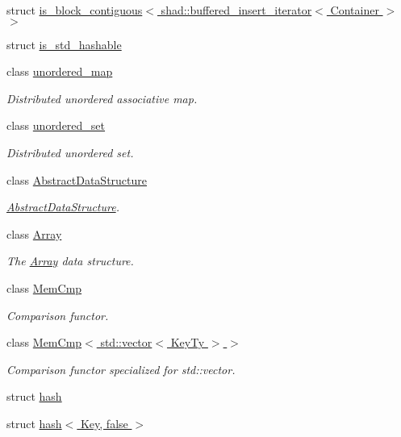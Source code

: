 \begin{DoxyCompactItemize}
\item 
struct \hyperlink{structshad_1_1is__block__contiguous_3_01shad_1_1buffered__insert__iterator_3_01Container_01_4_01_4}{is\-\_\-block\-\_\-contiguous$<$ shad\-::buffered\-\_\-insert\-\_\-iterator$<$ Container $>$ $>$}
\item 
struct \hyperlink{structshad_1_1is__std__hashable}{is\-\_\-std\-\_\-hashable}
\item 
class \hyperlink{classshad_1_1unordered__map}{unordered\-\_\-map}
\begin{DoxyCompactList}\small\item\em Distributed unordered associative map. \end{DoxyCompactList}\item 
class \hyperlink{classshad_1_1unordered__set}{unordered\-\_\-set}
\begin{DoxyCompactList}\small\item\em Distributed unordered set. \end{DoxyCompactList}\item 
class \hyperlink{classshad_1_1AbstractDataStructure}{Abstract\-Data\-Structure}
\begin{DoxyCompactList}\small\item\em \hyperlink{classshad_1_1AbstractDataStructure}{Abstract\-Data\-Structure}. \end{DoxyCompactList}\item 
class \hyperlink{classshad_1_1Array}{Array}
\begin{DoxyCompactList}\small\item\em The \hyperlink{classshad_1_1Array}{Array} data structure. \end{DoxyCompactList}\item 
class \hyperlink{classshad_1_1MemCmp}{Mem\-Cmp}
\begin{DoxyCompactList}\small\item\em Comparison functor. \end{DoxyCompactList}\item 
class \hyperlink{classshad_1_1MemCmp_3_01std_1_1vector_3_01KeyTy_01_4_01_4}{Mem\-Cmp$<$ std\-::vector$<$ Key\-Ty $>$ $>$}
\begin{DoxyCompactList}\small\item\em Comparison functor specialized for std\-::vector. \end{DoxyCompactList}\item 
struct \hyperlink{structshad_1_1hash}{hash}
\item 
struct \hyperlink{structshad_1_1hash_3_01Key_00_01false_01_4}{hash$<$ Key, false $>$}

\end{DoxyCompactItemize}
